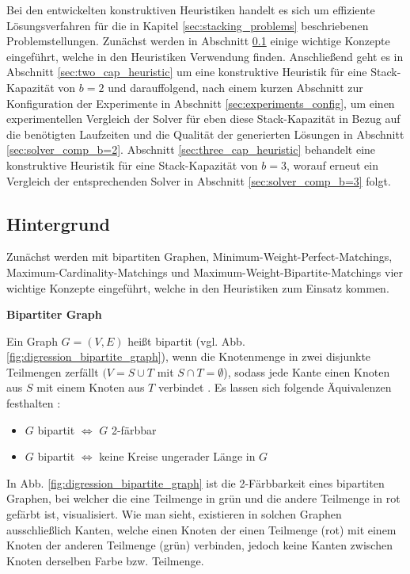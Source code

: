 Bei den entwickelten konstruktiven Heuristiken handelt es sich um effiziente Lösungsverfahren für die in Kapitel \ref{sec:stacking_problems} beschriebenen Problemstellungen. Zunächst werden in Abschnitt \ref{sec:digressions} einige wichtige Konzepte eingeführt, welche in den Heuristiken Verwendung finden.
Anschließend geht es in Abschnitt \ref{sec:two_cap_heuristic} um eine konstruktive Heuristik für eine Stack-Kapazität
von $b = 2$ und darauffolgend, nach einem kurzen Abschnitt zur Konfiguration der Experimente in Abschnitt \ref{sec:experiments_config}, um einen experimentellen Vergleich der Solver für eben diese Stack-Kapazität in Bezug
auf die benötigten Laufzeiten und die Qualität der generierten Lösungen in Abschnitt \ref{sec:solver_comp_b=2}.
Abschnitt \ref{sec:three_cap_heuristic} behandelt eine konstruktive Heuristik für eine Stack-Kapazität von $b=3$, worauf erneut ein Vergleich der entsprechenden Solver in Abschnitt \ref{sec:solver_comp_b=3} folgt.

\vfill
\pagebreak

\subsection{Hintergrund}
\label{sec:digressions}

Zunächst werden mit bipartiten Graphen, Minimum-Weight-Perfect-Matchings, Maximum-Cardinality-Matchings und Maximum-Weight-Bipartite-Matchings vier wichtige Konzepte eingeführt, welche in den Heuristiken zum Einsatz kommen.

\textbf{Bipartiter Graph}

Ein Graph $G = (V, E)$ heißt bipartit (vgl. Abb. \ref{fig:digression_bipartite_graph}), wenn die Knotenmenge in zwei disjunkte Teilmengen zerfällt
$(V = S \cup T$ mit $S \cap T = \emptyset$), sodass jede Kante einen Knoten aus $S$ mit einem Knoten aus $T$ verbindet \cite{HochschuleDarmstadt}.\newline
Es lassen sich folgende Äquivalenzen festhalten \cite{Leighton2010}:
\begin{itemize}
  \item $G$ bipartit $\iff$ $G$ 2-färbbar
  \item $G$ bipartit $\iff$ keine Kreise ungerader Länge in $G$
\end{itemize}
In Abb. \ref{fig:digression_bipartite_graph} ist die 2-Färbbarkeit eines bipartiten Graphen, bei welcher die eine Teilmenge
in grün und die andere Teilmenge in rot gefärbt ist, visualisiert. Wie man sieht, existieren in solchen Graphen
ausschließlich Kanten, welche einen Knoten der einen Teilmenge (rot) mit einem Knoten der anderen Teilmenge (grün) verbinden,
jedoch keine Kanten zwischen Knoten derselben Farbe bzw. Teilmenge.

